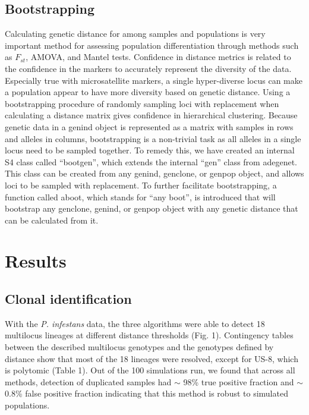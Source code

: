 \documentclass{frontiersSCNS} %
\begin{document}
\subsection*{Bootstrapping}\label{bootstrapping}

Calculating genetic distance for among samples and populations is very
important method for assessing population differentiation through
methods such as \(F_{st}\), AMOVA, and Mantel tests. Confidence in
distance metrics is related to the confidence in the markers to
accurately represent the diversity of the data. Especially true with
microsatellite markers, a single hyper-diverse locus can make a
population appear to have more diversity based on genetic distance.
Using a bootstrapping procedure of randomly sampling loci with
replacement when calculating a distance matrix gives confidence in
hierarchical clustering. Because genetic data in a genind object is
represented as a matrix with samples in rows and alleles in columns,
bootstrapping is a non-trivial task as all alleles in a single locus
need to be sampled together. To remedy this, we have created an internal
S4 class called ``bootgen'', which extends the internal ``gen'' class
from adegenet. This class can be created from any genind, genclone, or
genpop object, and allows loci to be sampled with replacement. To
further facilitate bootstrapping, a function called aboot, which stands
for ``any boot'', is introduced that will bootstrap any genclone,
genind, or genpop object with any genetic distance that can be
calculated from it.

\section*{Results}\label{results}

\subsection*{Clonal identification}\label{clonal-identification-1}

With the \emph{P. infestans} data, the three algorithms were able to
detect 18 multilocus lineages at different distance thresholds (Fig. 1).
Contingency tables between the described multilocus genotypes and the
genotypes defined by distance show that most of the 18 lineages were
resolved, except for US-8, which is polytomic (Table 1). Out of the 100
simulations run, we found that across all methods, detection of
duplicated samples had \(\sim\) 98\% true positive fraction and \(\sim\)
0.8\% false positive fraction indicating that this method is robust to
simulated populations.
\end{document}
